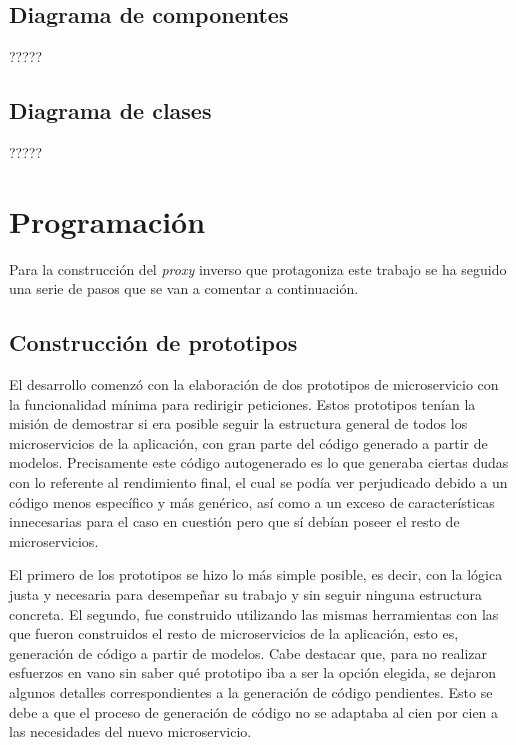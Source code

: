 \documentclass[11pt,spanish,listoffigures]{tfgetsinf}
\begin{document}
\subsection{Diagrama de componentes}

?????

\subsection{Diagrama de clases}

?????


\section{Programación}

Para la construcción del \emph{proxy} inverso que protagoniza este trabajo se ha seguido una serie de pasos que se van a comentar a continuación.

\subsection{Construcción de prototipos}

El desarrollo comenzó con la elaboración de dos prototipos de microservicio con la funcionalidad mínima para redirigir peticiones. Estos prototipos tenían la misión de demostrar si era posible seguir la estructura general de todos los microservicios de la aplicación, con gran parte del código generado a partir de modelos. Precisamente este código autogenerado es lo que generaba ciertas dudas con lo referente al rendimiento final, el cual se podía ver perjudicado debido a un código menos específico y más genérico, así como a un exceso de características innecesarias para el caso en cuestión pero que sí debían poseer el resto de microservicios.

El primero de los prototipos se hizo lo más simple posible, es decir, con la lógica justa y necesaria para desempeñar su trabajo y sin seguir ninguna estructura concreta. El segundo, fue construido utilizando las mismas herramientas con las que fueron construidos el resto de microservicios de la aplicación, esto es, generación de código a partir de modelos. Cabe destacar que, para no realizar esfuerzos en vano sin saber qué prototipo iba a ser la opción elegida, se dejaron algunos detalles correspondientes a la generación de código pendientes. Esto se debe a que el proceso de generación de código no se adaptaba al cien por cien a las necesidades del nuevo microservicio.
\end{document}
